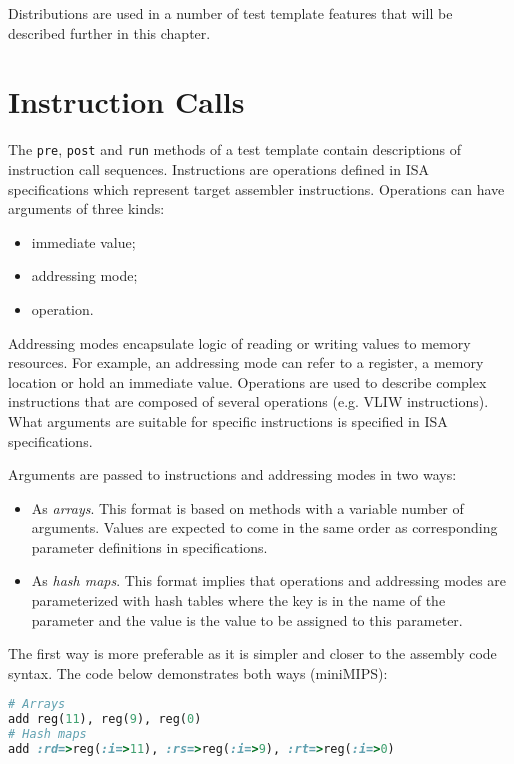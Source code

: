\documentclass[oneside,final,12pt]{extreport}
\begin{document}
Distributions are used in a number of test template features that will be described
further in this chapter.


\section{Instruction Calls}

The \texttt{pre}, \texttt{post} and \texttt{run} methods of a test template contain
descriptions of instruction call sequences. Instructions are operations defined
in ISA specifications which represent target assembler instructions. Operations can
have arguments of three kinds:

\begin{itemize}
\item immediate value;
\item addressing mode;
\item operation.
\end{itemize}

Addressing modes encapsulate logic of reading or writing values to memory resources.
For example, an addressing mode can refer to a register, a memory location or hold
an immediate value. Operations are used to describe complex instructions that are
composed of several operations (e.g. VLIW instructions). What arguments are suitable
for specific instructions is specified in ISA specifications.

Arguments are passed to instructions and addressing modes in two ways:
\begin{itemize}
\item As \emph{arrays}. This format is based on methods with a variable number of arguments.
      Values are expected to come in the same order as corresponding parameter definitions
      in specifications. 

\item As \emph{hash maps}. This format implies that operations and addressing modes are
      parameterized with hash tables where the key is in the name of the parameter
      and the value is the value to be assigned to this parameter.
\end{itemize}

The first way is more preferable as it is simpler and closer to the assembly code syntax.
The code below demonstrates both ways (miniMIPS):

\begin{lstlisting}[language=ruby]
# Arrays
add reg(11), reg(9), reg(0)
# Hash maps
add :rd=>reg(:i=>11), :rs=>reg(:i=>9), :rt=>reg(:i=>0)
\end{lstlisting}
\end{document}
